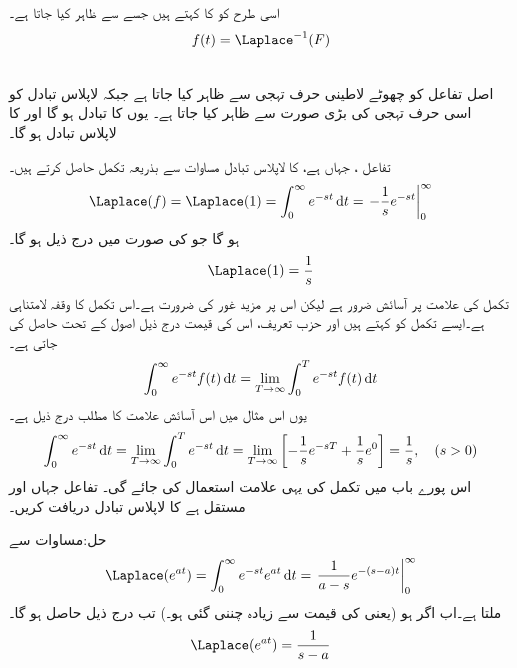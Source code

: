 اسی طرح  کو  کا  کہتے ہیں جسے  سے ظاہر کیا جاتا ہے۔
\begin{align}
f(t)=\Laplace^{-1}(F)
\end{align}

\\
اصل تفاعل کو چھوٹے لاطینی حرف تہجی سے ظاہر کیا جاتا ہے جبکہ لاپلاس تبادل کو اسی حرف تہجی کی بڑی صورت سے ظاہر کیا جاتا ہے۔ یوں  کا تبادل  ہو گا اور  کا لاپلاس تبادل  ہو گا۔

تفاعل ، جہاں  ہے، کا لاپلاس تبادل مساوات  سے بذریعہ تکمل حاصل کرتے ہیں۔
\begin{align*}
\Laplace(f)=\Laplace(1)=\int_{0}^{\infty} e^{-st} \dif t=\left. -\frac{1}{s}e^{-st}\right|_{0}^{\infty}
\end{align*}
ہو گا جو  کی صورت میں درج ذیل ہو گا۔
\begin{align*}
\Laplace(1)=\frac{1}{s}
\end{align*}
تکمل  کی علامت پر آسائش ضرور ہے لیکن اس پر مزید غور کی ضرورت ہے۔اس تکمل کا وقفہ لامتناہی ہے۔ایسے تکمل کو  کہتے ہیں اور حزب  تعریف، اس کی قیمت درج ذیل اصول کے تحت حاصل کی جاتی ہے۔ 
\begin{align*}
\int_{0}^{\infty} e^{-st}f(t)\dif t=\lim_{T\to \infty} \int_{0}^{T}e^{-st}f(t)\dif t
\end{align*}
یوں اس مثال میں اس آسائش علامت کا مطلب درج ذیل ہے۔
\begin{align*}
\int_{0}^{\infty}e^{-st}\dif t=\lim_{T\to \infty}\int_{0}^{T}e^{-st}\dif t=\lim_{T\to \infty}\left[-\frac{1}{s}e^{-sT}+\frac{1}{s}e^{0}\right]=\frac{1}{s}, \quad (s>0)
\end{align*}
اس پورے باب میں تکمل کی یہی علامت استعمال کی جائے گی۔
تفاعل  جہاں  اور  مستقل ہے کا لاپلاس تبادل  دریافت کریں۔

حل:مساوات  سے
\begin{align*}
\Laplace(e^{at})=\int_{0}^{\infty} e^{-st}e^{at}\dif t=\left.\frac{1}{a-s}e^{-(s-a)t} \right|_{0}^{\infty}
\end{align*}
ملتا ہے۔اب اگر  ہو (یعنی  کی قیمت  سے زیادہ چننی گئی ہو۔)  تب درج ذیل حاصل ہو گا۔
\begin{align*}
\Laplace(e^{at})=\frac{1}{s-a}
\end{align*}

